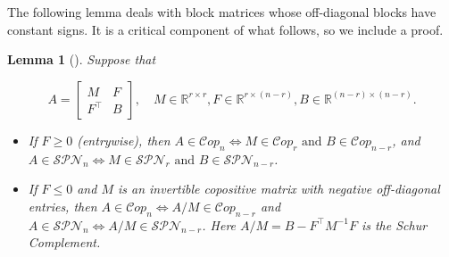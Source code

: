 \documentclass{amsart}
\newcommand{\bbR}{\mathbb{R}}
\newcommand{\Cop}{\mathcal{C}op}
\newcommand{\SPN}{\mathcal{SPN}}
\newtheorem{lemma}[theorem]{Lemma}
\theoremstyle{definition}
\begin{document}
The following lemma deals with block matrices whose off-diagonal blocks have constant signs. It is a critical component of what follows, so we include a proof. 

\begin{lemma}[{\cite[Lemma 3.4]{shaked-monderer_spn_2016}}]\label{lem:row_signs}
Suppose that 

\[A = \begin{bmatrix} M & F \\ F^\top & B\end{bmatrix}, \quad M \in \bbR^{r\times r}, F \in \bbR^{r \times (n-r)}, B \in \bbR^{(n-r)\times (n-r)}.\]

\begin{itemize}
\item If $F \geq 0$ (entrywise), then $A \in \Cop_n \iff M \in \Cop_r \text{ and } B \in \Cop_{n-r}$,  and $A \in \mathcal{SPN}_n \iff M \in \SPN_r \text{ and } B \in \mathcal{SPN}_{n-r}$.
\item If $F \leq 0$ and $M$ is an invertible copositive matrix with negative off-diagonal entries, then $A \in \Cop_{n} \iff A/M \in \Cop_{n-r}$ and $A \in \SPN_n \iff A/M \in \SPN_{n-r}$. Here $A/M = B- F^\top M^{-1}F$ is the Schur Complement.
\end{itemize}
\end{lemma}
\end{document}
